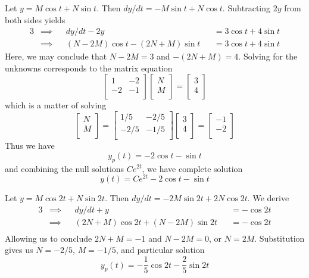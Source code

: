 \documentclass[a4paper]{article}
\begin{document}
Let \(y = M \cos t + N \sin t\). Then \(dy / dt = - M \sin t + N \cos t\). Subtracting \(2y\) from both sides yields
\begin{alignat*}{3}
	&\implies && dy / dt - 2y && = 3 \cos t + 4 \sin t \\
	&\implies && \!\left( N - 2M \right)  \cos t - \!\left( 2N + M \right)  \sin t && = 3 \cos t + 4 \sin t 
\end{alignat*}
Here, we may conclude that \(N - 2M = 3\) and \(- \!\left( 2N + M \right)= 4\). Solving for the unknowns corresponds to the matrix equation
\[
	\begin{bmatrix}
		1 & -2 \\
		-2 & -1 \\
	\end{bmatrix}
\begin{bmatrix}
N	 \\
M	 \\
\end{bmatrix}
=
\begin{bmatrix}
	3 \\
	4 \\
\end{bmatrix}
\]
which is a matter of solving
\[
	\begin{bmatrix}
		N \\
		M \\
	\end{bmatrix}
=
\begin{bmatrix}
	1/5 & -2/5 \\
	-2/5 & -1/5 \\
\end{bmatrix}
\begin{bmatrix}
	3 \\
	4 \\
\end{bmatrix}
=
\begin{bmatrix}
	-1 \\
	-2 \\
\end{bmatrix}
\]
Thus we have
\[
	y_{p} \!\left( t \right) = -2 \cos t - \sin t
\]
and combining the null solutions \(Ce^{2t}\), we have complete solution
\[
	y \!\left( t \right) = Ce^{2t} - 2 \cos t - \sin t
\]

Let \(y = M \cos 2t + N \sin 2t\). Then \(dy/dt = - 2M \sin 2t + 2N \cos 2t\). We derive
\begin{alignat*}{3}
	&\implies && dy / dt + y && = - \cos 2t \\
	&\implies && \!\left( 2N + M \right) \cos 2t + \!\left( N - 2M \right) \sin 2t && = -\cos 2t \\ 
\end{alignat*}
Allowing us to conclude \(2N + M = -1\) and \(N - 2M = 0\), or \(N = 2M\). Substitution gives us \(N = -2/5\), \(M = -1/5\), and particular solution
\[
	y_{p} \!\left( t \right) = - \frac{1}{5} \cos 2t - \frac{2}{5} \sin 2t
\]
\end{document}
